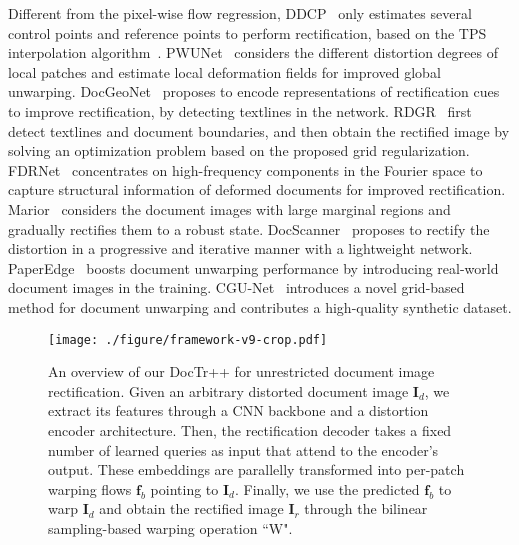 \documentclass[lettersize,journal]{IEEEtran}
\begin{document}
Different from the pixel-wise flow regression, DDCP~\cite{xie2021document} only estimates several control points and reference points to perform rectification,
based on the TPS interpolation algorithm~\cite{meijering2002chronology}.
PWUNet~\cite{das2021end} considers the different distortion degrees of local patches and estimate local deformation fields for improved global unwarping.
DocGeoNet~\cite{feng2022geometric} proposes to encode representations of rectification cues to improve rectification, by detecting textlines in the network.
RDGR~\cite{jiang2022revisiting} first detect textlines and document boundaries, and then obtain the rectified image by solving an optimization problem based on the proposed grid regularization.
FDRNet~\cite{xue2022fourier} concentrates on high-frequency components in the Fourier space to capture structural information of deformed documents for improved rectification.
Marior~\cite{zhang2022marior} considers the document images with large marginal regions and gradually rectifies them to a robust state.
DocScanner~\cite{feng2021docscanner} proposes to rectify the distortion in a progressive and iterative manner with a lightweight network.
PaperEdge~\cite{ma2022learning} boosts document unwarping performance by introducing real-world document images in the training.
CGU-Net~\cite{verhoeven2023neural} introduces a novel grid-based method for document unwarping and contributes a high-quality synthetic dataset.

\begin{figure*}[t]
  \centering
  \texttt{[image: ./figure/framework-v9-crop.pdf]}
  \caption{An overview of our DocTr++ for unrestricted document image rectification. Given an arbitrary distorted document image $\bm{I}_d$, we extract its features through a CNN backbone and a distortion encoder architecture. 
  Then, the rectification decoder takes a fixed number of learned queries as input that attend to the encoder's output.
  These embeddings are parallelly transformed into per-patch warping flows $\bm{f}_b$ pointing to $\bm{I}_d$.
  Finally, we use the predicted $\bm{f}_b$ to warp $\bm{I}_d$ and obtain the rectified image $\bm{I}_r$ through the bilinear sampling-based warping operation ``W".
  }
  \label{fig:overview}
\end{figure*}
\end{document}
